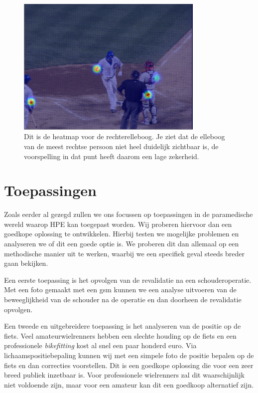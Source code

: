 \documentclass[a4paper,twoside,kulak]{kulakreport}
\begin{document}
\begin{figure}
	\centering
	\includegraphics[width=0.8\textwidth]{heatmap_1}
	\caption{Dit is de heatmap voor de rechterelleboog. Je ziet dat de elleboog van de meest rechtse persoon niet heel duidelijk zichtbaar is, de voorspelling in dat punt heeft daarom een lage zekerheid.}
	\label{heatmap}
\end{figure}


\chapter{Toepassingen}
Zoals eerder al gezegd zullen we ons focussen op toepassingen in de paramedische wereld waarop HPE kan toegepast worden. Wij proberen hiervoor dan een goedkope oplossing te ontwikkelen. Hierbij testen we mogelijke problemen en analyseren we of dit  een goede optie is. We proberen dit dan allemaal op een methodische manier uit te werken, waarbij we een specifiek geval steeds breder gaan bekijken.

Een eerste toepassing is het opvolgen van de revalidatie na een schouderoperatie. Met een foto gemaakt met een gsm kunnen we een analyse uitvoeren van de beweeglijkheid van de schouder na de operatie en dan doorheen de revalidatie opvolgen.

Een tweede en uitgebreidere toepassing is het analyseren van de positie op de fiets. Veel amateurwielrenners hebben een slechte houding op de fiets en een professionele \emph{bikefitting} kost al snel een paar honderd euro. Via lichaamspositiebepaling kunnen wij met een simpele foto de positie bepalen op de fiets en dan correcties voorstellen. Dit is een goedkope oplossing die voor een zeer breed publiek inzetbaar is. Voor professionele wielrenners zal dit waarschijnlijk niet voldoende zijn, maar voor een amateur kan dit een goedkoop alternatief zijn.
\end{document}
